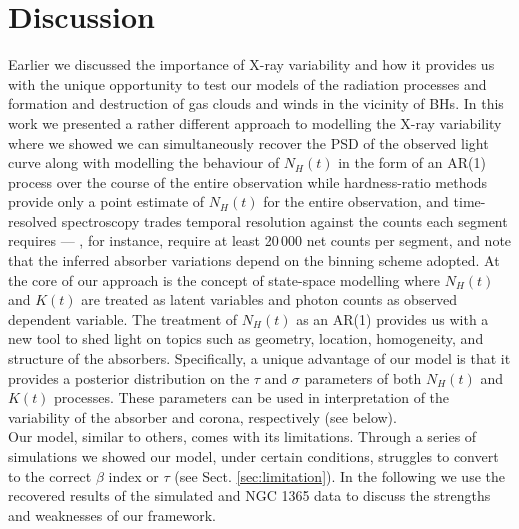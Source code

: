 \documentclass{aa}
\begin{document}
\FloatBarrier
\section{Discussion}
\label{sec:discussion}
Earlier we discussed the importance of X-ray variability and how it provides us with the unique opportunity to test our models of the radiation processes and formation and destruction of gas clouds and winds in the vicinity of BHs. In this work we presented a rather different approach to modelling the X-ray variability where we showed we can simultaneously recover the PSD of the observed light curve along with modelling the behaviour of $N_H(t)$ in the form of an AR(1) process over the course of the entire observation while hardness-ratio methods provide only a point estimate of $N_H(t)$ for the entire observation, and time-resolved spectroscopy trades temporal resolution against the counts each segment requires --- \citet{Huang2026}, for instance, require at least 20\,000 net counts per segment, and note that the inferred absorber variations depend on the binning scheme adopted. At the core of our approach is the concept of state-space modelling where $N_H(t)$ and $K(t)$ are treated as latent variables and photon counts as observed dependent variable. The treatment of $N_H(t)$ as an AR(1) provides us with a new tool to shed light on topics such as geometry, location, homogeneity, and structure of the absorbers. Specifically, a unique advantage of our model is that it provides a posterior distribution on the $\tau$ and $\sigma$ parameters of both $N_H(t)$ and $K(t)$ processes. These parameters can be used in interpretation of the variability of the absorber and corona, respectively (see below). \\
Our model, similar to others, comes with its limitations. Through a series of simulations we showed our model, under certain conditions, struggles to convert to the correct $\beta$ index or $\tau$ (see Sect. \ref{sec:limitation}). In the following we use the recovered results of the simulated and NGC 1365 data to discuss the strengths and weaknesses of our framework. \\
\end{document}
